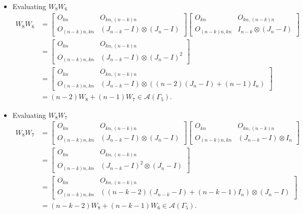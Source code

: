 \begin{itemize}
\item Evaluating $W_{8}W_{6}$
\begin{align*}
    W_8W_6
    &= \begin{bmatrix}
        O_{kn} & O_{kn, (n-k)n} \\
        O_{(n-k)n,kn} & (J_{n-k} - I) \otimes (J_n-I)
    \end{bmatrix}
    \begin{bmatrix}
        O_{kn} & O_{kn, (n-k)n} \\
        O_{(n-k)n,kn} & I_{n-k}\otimes(J_n-I)
    \end{bmatrix}\\
    &= \begin{bmatrix}
        O_{kn} & O_{kn, (n-k)n} \\
        O_{(n-k)n,kn} & (J_{n-k} - I) \otimes (J_n-I)^2
    \end{bmatrix}\\
    &= \begin{bmatrix}
        O_{kn} & O_{kn, (n-k)n} \\
        O_{(n-k)n,kn} & (J_{n-k} - I) \otimes ((n-2)(J_n-I) + (n-1)I_n)
    \end{bmatrix}\\
    &= (n-2)W_8+(n-1)W_7\in\mathcal{A}(\Gamma_5).
\end{align*}

\item Evaluating $W_{8}W_{7}$
\begin{align*}
    W_8W_7
    &= \begin{bmatrix}
        O_{kn} & O_{kn, (n-k)n} \\
        O_{(n-k)n,kn} & (J_{n-k} - I) \otimes (J_n-I)
    \end{bmatrix}
    \begin{bmatrix}
        O_{kn} & O_{kn, (n-k)n} \\
        O_{(n-k)n,kn} & (J_{n-k}-I)\otimes I_n
    \end{bmatrix}\\
    &= \begin{bmatrix}
        O_{kn} & O_{kn, (n-k)n} \\
        O_{(n-k)n,kn} & (J_{n-k} - I)^2 \otimes (J_n-I)
    \end{bmatrix}\\
    &= \begin{bmatrix}
        O_{kn} & O_{kn, (n-k)n} \\
        O_{(n-k)n,kn} & ((n-k-2)(J_{n-k} - I) + (n-k-1)I_n) \otimes (J_n-I)
    \end{bmatrix}\\
    &= (n-k-2)W_8+(n-k-1)W_6\in\mathcal{A}(\Gamma_5).
\end{align*}


\end{itemize}
